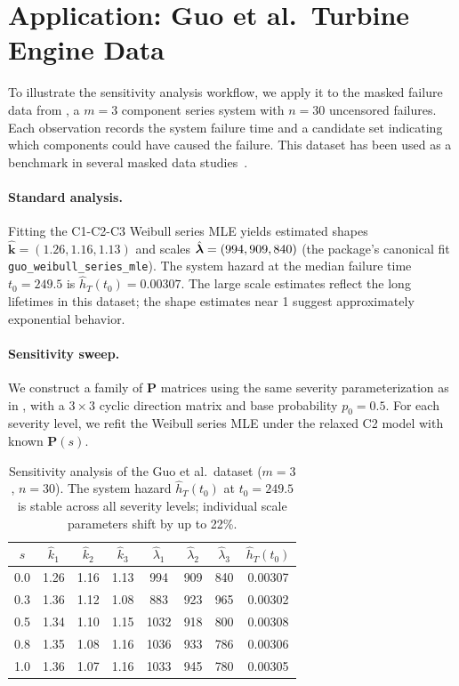 \section{Application: Guo et al.\ Turbine Engine Data}
\label{sec:application}

To illustrate the sensitivity analysis workflow, we apply it to the masked
failure data from \citet{Huairu-2013}, a $m = 3$ component series system with
$n = 30$ uncensored failures. Each observation records the system failure time
and a candidate set indicating which components could have caused the failure.
This dataset has been used as a benchmark in several masked data
studies~\citep{Huairu-2013, towell2023reliability}.

\paragraph{Standard analysis.}
Fitting the C1-C2-C3 Weibull series MLE yields estimated shapes
$\hat{\mathbf{k}} = (1.26, 1.16, 1.13)$ and scales
$\hat{\bm{\lambda}} = (994, 909, 840)$ (the package's canonical fit
\texttt{guo\_weibull\_series\_mle}). The system hazard at the median failure
time $t_0 = 249.5$ is $\hat{h}_T(t_0) = 0.00307$. The large scale estimates
reflect the long lifetimes in this dataset; the shape estimates near 1 suggest
approximately exponential behavior.

\paragraph{Sensitivity sweep.}
We construct a family of $\mathbf{P}$ matrices using the same severity
parameterization as in , with a $3 \times 3$ cyclic
direction matrix and base probability $p_0 = 0.5$. For each severity level,
we refit the Weibull series MLE under the relaxed C2 model with known
$\mathbf{P}(s)$.

\begin{table}[htbp]
\centering
\caption{Sensitivity analysis of the Guo et al.\ dataset ($m = 3$, $n = 30$).
The system hazard $\hat{h}_T(t_0)$ at $t_0 = 249.5$ is stable across all
severity levels; individual scale parameters shift by up to 22\%.}
\label{tab:guo-sensitivity}
\small
\begin{tabular}{c ccc ccc c}
\toprule
$s$ & $\hat{k}_1$ & $\hat{k}_2$ & $\hat{k}_3$ &
      $\hat{\lambda}_1$ & $\hat{\lambda}_2$ & $\hat{\lambda}_3$ &
      $\hat{h}_T(t_0)$ \\
\midrule
0.0 & 1.26 & 1.16 & 1.13 &  994 & 909 & 840 & 0.00307 \\
0.3 & 1.36 & 1.12 & 1.08 &  883 & 923 & 965 & 0.00302 \\
0.5 & 1.34 & 1.10 & 1.15 & 1032 & 918 & 800 & 0.00308 \\
0.8 & 1.35 & 1.08 & 1.16 & 1036 & 933 & 786 & 0.00306 \\
1.0 & 1.36 & 1.07 & 1.16 & 1033 & 945 & 780 & 0.00305 \\
\bottomrule
\end{tabular}
\end{table}

